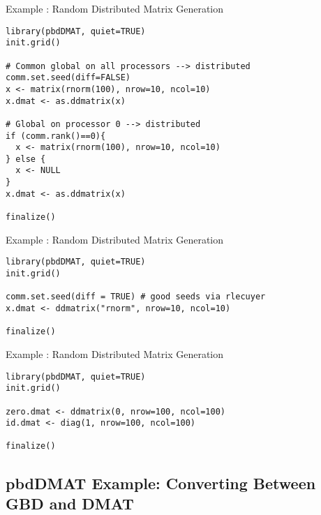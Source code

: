 \begin{frame}
  \begin{exampleblock}{Example \countex:  Random Distributed Matrix Generation}\pause
\begin{lstlisting}[title=Generate a global matrix and distribute it]
library(pbdDMAT, quiet=TRUE)
init.grid()

# Common global on all processors --> distributed
comm.set.seed(diff=FALSE)
x <- matrix(rnorm(100), nrow=10, ncol=10)
x.dmat <- as.ddmatrix(x)

# Global on processor 0 --> distributed
if (comm.rank()==0){
  x <- matrix(rnorm(100), nrow=10, ncol=10)
} else {
  x <- NULL
}
x.dmat <- as.ddmatrix(x)

finalize()
\end{lstlisting}
  \end{exampleblock}
\end{frame}

\begin{frame}[fragile]
  \begin{exampleblock}{Example \countex:  Random Distributed Matrix Generation}\pause
\begin{lstlisting}[title=Generate locally only what is needed]
library(pbdDMAT, quiet=TRUE)
init.grid()

comm.set.seed(diff = TRUE) # good seeds via rlecuyer
x.dmat <- ddmatrix("rnorm", nrow=10, ncol=10)

finalize()
\end{lstlisting}
  \end{exampleblock}
\end{frame}

\begin{frame}[fragile]
  \begin{exampleblock}{Example \countex:  Random Distributed Matrix Generation}\pause
\begin{lstlisting}[title=Generate locally only what is needed]
library(pbdDMAT, quiet=TRUE)
init.grid()

zero.dmat <- ddmatrix(0, nrow=100, ncol=100)
id.dmat <- diag(1, nrow=100, ncol=100)

finalize()
\end{lstlisting}
  \end{exampleblock}
\end{frame}




\subsection{pbdDMAT Example: Converting Between GBD and DMAT}

